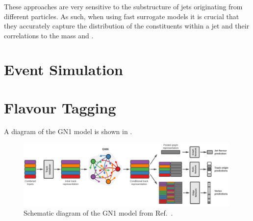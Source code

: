 These approaches are very sensitive to the substructure of jets originating from different particles.
As such, when using fast surrogate models it is crucial that they accurately capture the distribution of the constituents within a jet and their correlations to the mass and \pt.



\section{Event Simulation}

\section{Flavour Tagging}

A diagram of the GN1 model is shown in .

\begin{figure}
    \centering
    \includegraphics[width=0.99\textwidth]{figures/atlas/gn1.png}
    \caption{Schematic diagram of the GN1 model from Ref.~\cite{GN1}.}
    \label{fig:gn1}
\end{figure}
